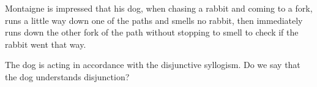 Montaigne is impressed that his dog, when chasing
a rabbit and coming to a fork, runs a little way
down one of the paths and smells no rabbit, then
immediately runs down the other fork of the path
without stopping to smell to check if the rabbit
went that way. \cite{de1987apology}

The dog is acting in accordance with the
disjunctive syllogism. Do we say that the dog
understands disjunction?